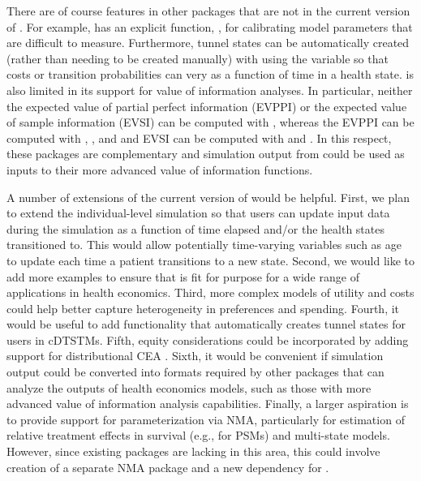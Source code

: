 \documentclass[article, nojss]{jss}\usepackage[]{graphicx}\usepackage[]{color}
\begin{document}
There are of course features in other  packages that are not in the current version of . For example,  has an explicit function, , for calibrating model parameters that are difficult to measure. Furthermore, tunnel states can be automatically created (rather than needing to be created manually) with  using the  variable so that costs or transition probabilities can very as a function of time in a health state.  is also limited in its support for value of information analyses. In particular, neither the expected value of partial perfect information (EVPPI) or the expected value of sample information (EVSI) can be computed with , whereas the EVPPI can be computed with , , and  and EVSI can be computed with  and . In this respect, these packages are complementary and simulation output from  could be used as inputs to their more advanced value of information functions.

A number of extensions of the current version of  would be helpful. First, we plan to extend the individual-level simulation so that users can update input data during the simulation as a function of time elapsed and/or the health states transitioned to. This would allow potentially time-varying variables such as age to update each time a patient transitions to a new state. Second, we would like to add more examples to ensure that  is fit for purpose for a wide range of applications in health economics. Third, more complex models of utility \citep{kharroubi2007modelling, hernandez2013relationship} and costs \citep{nixon2005methods} could help better capture heterogeneity in preferences and spending. Fourth, it would be useful to add functionality that automatically creates tunnel states for users in cDTSTMs. Fifth, equity considerations could be incorporated by adding support for distributional CEA \citep{asaria2015distributional, asaria2016distributional, cookson2017using}. Sixth, it would be convenient if  simulation output could be converted into formats required by other packages that can analyze the outputs of health economics models, such as those with more advanced value of information analysis capabilities. Finally, a larger aspiration is to provide support for parameterization via NMA, particularly for estimation of relative treatment effects in survival (e.g., for PSMs) and multi-state models. However, since existing  packages are lacking in this area, this could involve creation of a separate NMA package and a new dependency for . 
\end{document}
